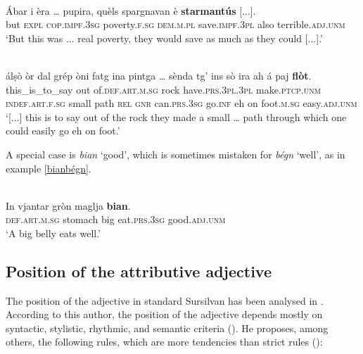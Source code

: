 \ea
{}\\
\gll   Ábar i èra … pupira, quèls spargnavan è \textbf{starmantús} [...].\\
but \textsc{expl}  \textsc{cop.impf.3sg} {} poverty.\textsc{f.sg} \textsc{dem.m.pl} save.\textsc{impf.3pl} also terrible.\textsc{adj.unm}\\
\glt `But this was ... real poverty, they would save as much as they could [...].'
\z

\ea
{}\\
\gll  [...] álṣò òr dal grép òni fatg ina pintga …  sènda tg’ ins sò ira ah á paj \textbf{flòt}.\\
{} this\_is\_to\_say out of.\textsc{def.art.m.sg} rock have.\textsc{prs.3pl.3pl} make.\textsc{ptcp.unm} \textsc{indef.art.f.sg} small {} path \textsc{rel} \textsc{gnr} can.\textsc{prs.3sg} go.\textsc{inf} eh on foot.\textsc{m.sg} easy.\textsc{adj.unm} \\
\glt `[...] this is to say out of the rock they made a small … path through which one could easily go eh on foot.'
\z

A special case is \textit{bian} `good', which is sometimes mistaken for \textit{bégn} `well', as in example {\ref{bianbégn}}.

\ea\label{bianbégn}
\\
\gll  In vjantar gròn maglja \textbf{bian}. \\
     \textsc{def.art.m.sg} stomach big eat.\textsc{prs.3sg} good.\textsc{adj.unm} \\
\glt `A big belly eats well.'
\z

\subsection{Position of the attributive adjective}
The position of the adjective in standard Sursilvan has been analysed in \citet{Winzap1981}. According to this author, the position of the adjective depends mostly on syntactic, stylistic, rhythmic, and semantic criteria (\citet[1]{Winzap1981}). He proposes, among others, the following rules, which are more tendencies than strict rules (\citet[3ff.]{Winzap1981}): 

